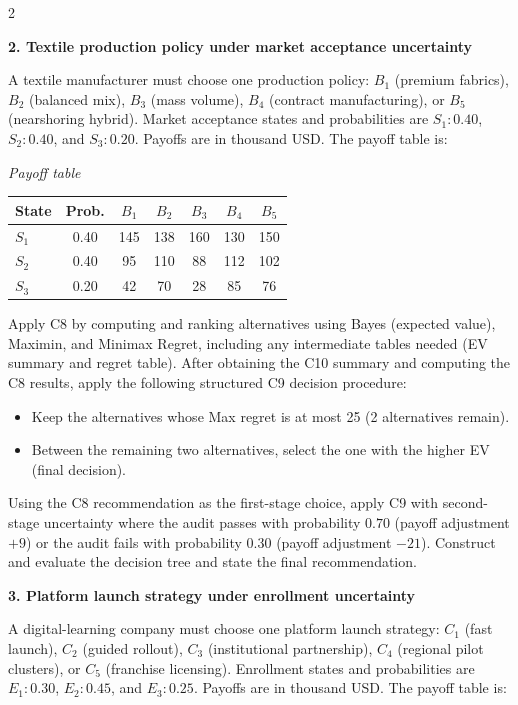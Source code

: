 \documentclass[12pt]{article}
\newcommand{\SubsectionBox}[1]{%
	\noindent\colorbox{gray!30}{%
		\parbox{\linewidth}{\textbf{#1}}%
	}\par\vspace{0.35cm}%
}
\begin{document}
\begin{multicols}{2}
		\vspace{0.25cm}
		\SubsectionBox{2. Textile production policy under market acceptance uncertainty}\vspace{-0.25cm}
		A textile manufacturer must choose one production policy: $B_1$ (premium fabrics), $B_2$ (balanced mix), $B_3$ (mass volume), $B_4$ (contract manufacturing), or $B_5$ (nearshoring hybrid).
		Market acceptance states and probabilities are $S_1:0.40$, $S_2:0.40$, and $S_3:0.20$. Payoffs are in thousand USD. The payoff table is:
		
		\begin{center}
			\textit{Payoff table} \\
			\begin{tabular}{l c c c c c c}
				\hline
				State& Prob. & $B_1$ & $B_2$ & $B_3$ & $B_4$ & $B_5$ \\
				\hline
				$S_1$ & 0.40 & 145 & 138 & 160 & 130 & 150 \\
				$S_2$ & 0.40 & 95 & 110 & 88 & 112 & 102 \\
				$S_3$ & 0.20 & 42 & 70 & 28 & 85 & 76 \\
				\hline
			\end{tabular}
		\end{center}
		
		Apply C8 by computing and ranking alternatives using Bayes (expected value), Maximin, and Minimax Regret, including any intermediate tables needed (EV summary and regret table).
		After obtaining the C10 summary and computing the C8 results, apply the following structured C9 decision procedure:
		\begin{itemize}
			\item Keep the alternatives whose Max regret is at most 25 (2 alternatives remain).
			\item Between the remaining two alternatives, select the one with the higher EV (final decision).
		\end{itemize}
		Using the C8 recommendation as the first-stage choice, apply C9 with second-stage uncertainty where the audit passes with probability $0.70$ (payoff adjustment $+9$) or the audit fails with probability $0.30$ (payoff adjustment $-21$). Construct and evaluate the decision tree and state the final recommendation.
		
		\vspace{0.25cm}
		\SubsectionBox{3. Platform launch strategy under enrollment uncertainty}\vspace{-0.25cm}
		A digital-learning company must choose one platform launch strategy: $C_1$ (fast launch), $C_2$ (guided rollout), $C_3$ (institutional partnership), $C_4$ (regional pilot clusters), or $C_5$ (franchise licensing).
		Enrollment states and probabilities are $E_1:0.30$, $E_2:0.45$, and $E_3:0.25$. Payoffs are in thousand USD. The payoff table is:
		

\end{multicols}
\end{document}
